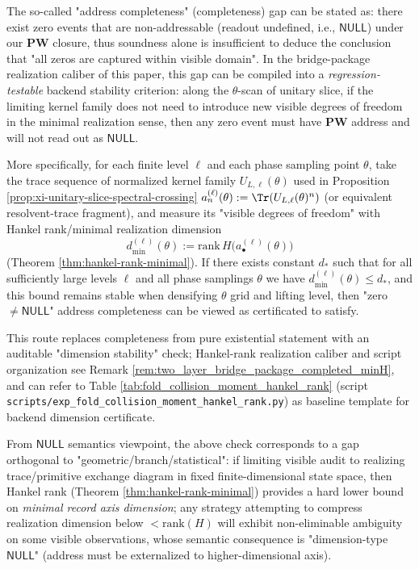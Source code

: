 \begin{remark}\label{rem:xi-acc-rank}
The so-called "address completeness" (completeness) gap can be stated as: there exist zero events that are non-addressable (readout undefined, i.e., \(\mathsf{NULL}\)) under our \(\mathbf{PW}\) closure, thus soundness alone is insufficient to deduce the conclusion that "all zeros are captured within visible domain".
In the bridge-package realization caliber of this paper, this gap can be compiled into a \emph{regression-testable} backend stability criterion: along the \(\theta\)-scan of unitary slice, if the limiting kernel family does not need to introduce new visible degrees of freedom in the minimal realization sense, then any zero event must have \(\mathbf{PW}\) address and will not read out as \(\mathsf{NULL}\).
\par
More specifically, for each finite level \(\ell\) and each phase sampling point \(\theta\), take the trace sequence of normalized kernel family \(U_{L,\ell}(\theta)\) used in Proposition \ref{prop:xi-unitary-slice-spectral-crossing}
\(
a^{(\ell)}_n(\theta):=\Tr(U_{L,\ell}(\theta)^n)
\)
(or equivalent resolvent-trace fragment), and measure its "visible degrees of freedom" with Hankel rank/minimal realization dimension
\[
d^{(\ell)}_{\min}(\theta):=\mathrm{rank}\,H\!\bigl(a^{(\ell)}_\bullet(\theta)\bigr)
\]
(Theorem \ref{thm:hankel-rank-minimal}).
If there exists constant \(d_\ast\) such that for all sufficiently large levels \(\ell\) and all phase samplings \(\theta\) we have \(d^{(\ell)}_{\min}(\theta)\le d_\ast\), and this bound remains stable when densifying \(\theta\) grid and lifting level, then "zero \(\neq\mathsf{NULL}\)" address completeness can be viewed as certificated to satisfy.
\par
This route replaces completeness from pure existential statement with an auditable "dimension stability" check; Hankel-rank realization caliber and script organization see Remark \ref{rem:two_layer_bridge_package_completed_minH}, and can refer to Table \ref{tab:fold_collision_moment_hankel_rank} (script \texttt{scripts/exp\_fold\_collision\_moment\_hankel\_rank.py}) as baseline template for backend dimension certificate.
\par
From \(\mathsf{NULL}\) semantics viewpoint, the above check corresponds to a gap orthogonal to "geometric/branch/statistical": if limiting visible audit to realizing trace/primitive exchange diagram in fixed finite-dimensional state space, then Hankel rank (Theorem \ref{thm:hankel-rank-minimal}) provides a hard lower bound on \emph{minimal record axis dimension}; any strategy attempting to compress realization dimension below \(<\mathrm{rank}(H)\) will exhibit non-eliminable ambiguity on some visible observations, whose semantic consequence is "dimension-type \(\mathsf{NULL}\)" (address must be externalized to higher-dimensional axis).

\end{remark}
